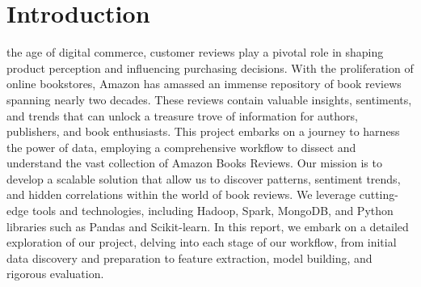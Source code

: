 \section{Introduction}
the age of digital commerce, customer reviews play a pivotal role in shaping product perception and influencing purchasing decisions.
With the proliferation of online bookstores, Amazon has amassed an immense repository of book reviews spanning nearly two decades.
These reviews contain valuable insights, sentiments, and trends that can unlock a treasure trove of information for authors, publishers, and book enthusiasts.
This project embarks on a journey to harness the power of data, employing a comprehensive workflow to dissect and understand the vast collection of Amazon Books Reviews.
Our mission is to develop a scalable solution that allow us to discover patterns, sentiment trends, and hidden correlations within the world of book reviews.
We leverage cutting-edge tools and technologies, including Hadoop, Spark, MongoDB, and Python libraries such as Pandas and Scikit-learn.
In this report, we embark on a detailed exploration of our project, delving into each stage of our workflow,
from initial data discovery and preparation to feature extraction, model building, and rigorous evaluation.
